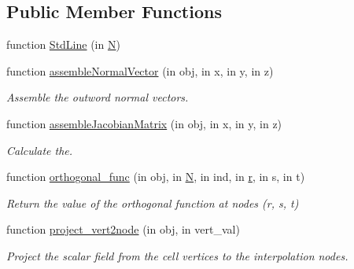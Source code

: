 \subsection*{Public Member Functions}
\begin{DoxyCompactItemize}
\item 
function \hyperlink{class_std_line_a7f60d1dcaa0b7d33c8dff10965928a84}{Std\+Line} (in \hyperlink{class_std_cell_a8df35ad5169af36d3dff62644f7878c9}{N})
\item 
function \hyperlink{class_std_line_aa88b6ed2a95def23340f683d2aa413b7}{assemble\+Normal\+Vector} (in obj, in x, in y, in z)
\begin{DoxyCompactList}\small\item\em Assemble the outword normal vectors. \end{DoxyCompactList}\item 
function \hyperlink{class_std_line_a8a17db483f9593a42f18b6c66537ac15}{assemble\+Jacobian\+Matrix} (in obj, in x, in y, in z)
\begin{DoxyCompactList}\small\item\em Calculate the. \end{DoxyCompactList}\item 
function \hyperlink{class_std_line_af948fcc85c712e30d54b87230bcaa29e}{orthogonal\+\_\+func} (in obj, in \hyperlink{class_std_cell_a8df35ad5169af36d3dff62644f7878c9}{N}, in ind, in \hyperlink{class_std_cell_a737dd2feb25f74be0215a594334ec622}{r}, in s, in t)
\begin{DoxyCompactList}\small\item\em Return the value of the orthogonal function at nodes (r, s, t) \end{DoxyCompactList}\item 
function \hyperlink{class_std_line_a97488277af0154b8b2ee9756d0199830}{project\+\_\+vert2node} (in obj, in vert\+\_\+val)
\begin{DoxyCompactList}\small\item\em Project the scalar field from the cell vertices to the interpolation nodes. \end{DoxyCompactList}\end{DoxyCompactItemize}
